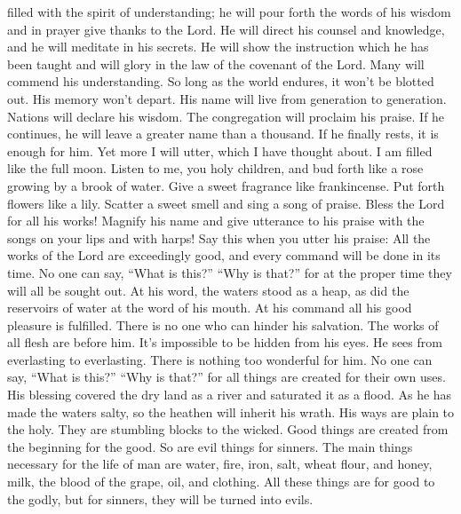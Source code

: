 filled with the spirit of understanding; he will pour forth the words of
his wisdom and in prayer give thanks to the Lord.  He will
direct his counsel and knowledge, and he will meditate in his secrets.
 He will show the instruction which he has been taught and
will glory in the law of the covenant of the Lord.  Many
will commend his understanding. So long as the world endures, it won't
be blotted out. His memory won't depart. His name will live from
generation to generation.  Nations will declare his wisdom.
The congregation will proclaim his praise.  If he
continues, he will leave a greater name than a thousand. If he finally
rests, it is enough for him.  Yet more I will utter, which
I have thought about. I am filled like the full moon. 
Listen to me, you holy children, and bud forth like a rose growing by a
brook of water.  Give a sweet fragrance like frankincense.
Put forth flowers like a lily. Scatter a sweet smell and sing a song of
praise. Bless the Lord for all his works!  Magnify his name
and give utterance to his praise with the songs on your lips and with
harps! Say this when you utter his praise:  All the works
of the Lord are exceedingly good, and every command will be done in its
time.  No one can say, ``What is this?'' ``Why is that?''
for at the proper time they will all be sought out. At his word, the
waters stood as a heap, as did the reservoirs of water at the word of
his mouth.  At his command all his good pleasure is
fulfilled. There is no one who can hinder his salvation. 
The works of all flesh are before him. It's impossible to be hidden from
his eyes.  He sees from everlasting to everlasting. There
is nothing too wonderful for him.  No one can say, ``What
is this?'' ``Why is that?'' for all things are created for their own
uses.  His blessing covered the dry land as a river and
saturated it as a flood.  As he has made the waters salty,
so the heathen will inherit his wrath.  His ways are plain
to the holy. They are stumbling blocks to the wicked.  Good
things are created from the beginning for the good. So are evil things
for sinners.  The main things necessary for the life of man
are water, fire, iron, salt, wheat flour, and honey, milk, the blood of
the grape, oil, and clothing.  All these things are for
good to the godly, but for sinners, they will be turned into evils.
